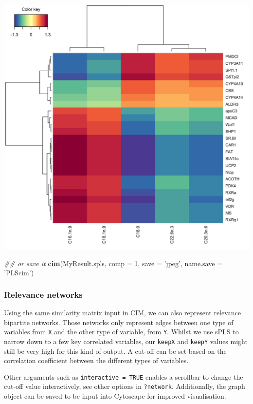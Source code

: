 \documentclass[]{book}
\newenvironment{Shaded}{\begin{snugshade}}{\end{snugshade}}
\newcommand{\CommentTok}[1]{\textcolor[rgb]{0.56,0.35,0.01}{\textit{#1}}}
\newcommand{\DataTypeTok}[1]{\textcolor[rgb]{0.13,0.29,0.53}{#1}}
\newcommand{\DecValTok}[1]{\textcolor[rgb]{0.00,0.00,0.81}{#1}}
\newcommand{\KeywordTok}[1]{\textcolor[rgb]{0.13,0.29,0.53}{\textbf{#1}}}
\newcommand{\NormalTok}[1]{#1}
\newcommand{\StringTok}[1]{\textcolor[rgb]{0.31,0.60,0.02}{#1}}
\begin{document}
\begin{center}\includegraphics[width=0.75\linewidth,]{Figures/05-pls-cim-1-1} \end{center}

\begin{Shaded}
\begin{Highlighting}[]
\CommentTok{## or save it}
\KeywordTok{cim}\NormalTok{(MyResult.spls, }\DataTypeTok{comp =} \DecValTok{1}\NormalTok{, }\DataTypeTok{save =} \StringTok{'jpeg'}\NormalTok{, }\DataTypeTok{name.save =} \StringTok{'PLScim'}\NormalTok{)}
\end{Highlighting}
\end{Shaded}

\hypertarget{pls:network}{%
\subsubsection{Relevance networks}\label{pls:network}}

Using the same similarity matrix input in CIM, we can also represent relevance bipartite networks. Those networks only represent edges between one type of variables from \texttt{X} and the other type of variable, from \texttt{Y}. Whilst we use sPLS to narrow down to a few key correlated variables, our \texttt{keepX} and \texttt{keepY} values might still be very high for this kind of output. A cut-off can be set based on the correlation coefficient between the different types of variables.

Other arguments such as \texttt{interactive\ =\ TRUE} enables a scrollbar to change the cut-off value interactively, see other options in \texttt{?network}. Additionally, the graph object can be saved to be input into Cytoscape for improved visualisation.
\end{document}
